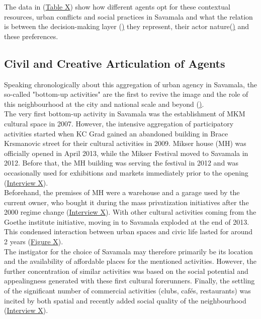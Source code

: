 \documentclass[11pt]{report}
\begin{document}
The data in (\href{Table 1}{Table X}) show how different agents opt for these contextual resources, urban conflicts and social practices in Savamala and what the relation is between the decision-making layer (\href{Section 4.2}\href{Section 4.2}) they represent, their actor nature(\href{Section 5.1}\href{Section 5.1}) and these preferences. 

\subsection{Civil and Creative Articulation of Agents}

Speaking chronologically about this aggregation of urban agency in Savamala, the so-called "bottom-up activities" are the first to revive the image and the role of this neighbourhood at the city and national scale and beyond (\href{Section 4.2.3}\href{Section 4.2.3}).
\\

The very first bottom-up activity in Savamala was the establishment of MKM cultural space in 2007. However, the intensive aggregation of participatory activities started when KC Grad gained an abandoned building in Brace Krsmanovic street for their cultural activities in 2009.
Mikser house (MH) was officially opened in April 2013, while the Mikser Festival moved to Savamala in 2012. Before that, the MH building was serving the festival in 2012 and was occasionally used for exhibitions and markets immediately prior to the opening
(\href{InterviewX}{Interview X}).
\\

Beforehand, the premises of MH were a warehouse and a garage used by the current owner, who bought it during the mass privatization initiatives after the 2000 regime change (\href{InterviewX}{Interview X}).
With other cultural activities coming from the Goethe institute initiative, moving in to Savamala exploded at the end of 2013. This condensed interaction between urban spaces and civic life lasted for around 2 years (\href{Figure 2}{Figure X}).
\\

The instigator for the choice of Savamala may therefore primarily be its location and the availability of affordable places for the mentioned activities.
However, the further concentration of similar activities was based on the social potential and appealingness generated with these first cultural forerunners.
Finally, the settling of the significant number of commercial activities (clubs, cafés, restaurants) was incited by both spatial and recently added social quality of the neighbourhood
(\href{InterviewX}{Interview X}).
\\
\end{document}
